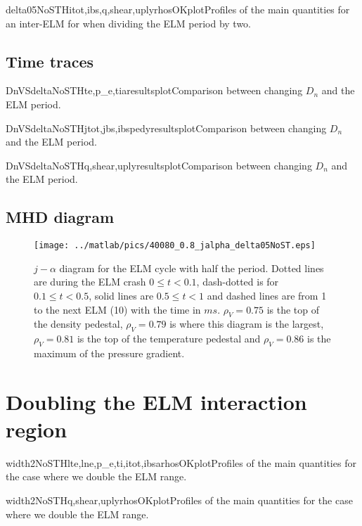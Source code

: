 \begin{AllFigs}{delta05NoST}{H}{}{itot,ibs,q,shear,upl}{y}{rhosOKplot}{Profiles of the main quantities for an inter-ELM for when dividing the ELM period by two.}
\end{AllFigs}
\subsection{Time traces}\label{sec:app:graphs:recovery:delta:traces}
\begin{AllFigs}{DnVSdeltaNoST}{H}{}{te,p_e,ti}{a}{resultsplot}{Comparison between changing $D_n$ and the ELM period.}
\end{AllFigs}

\begin{AllFigs}{DnVSdeltaNoST}{H}{}{jtot,jbs,ibsped}{y}{resultsplot}{Comparison between changing $D_n$ and the ELM period.}
\end{AllFigs}

\begin{AllFigs}{DnVSdeltaNoST}{H}{}{q,shear,upl}{y}{resultsplot}{Comparison between changing $D_n$ and the ELM period.}
\end{AllFigs}
\subsection{MHD diagram}\label{sec:app:graphs:recovery:delta:jalpha}
\begin{figure}[H]
\begin{center}
\texttt{[image: ../matlab/pics/40080\_0.8\_jalpha\_delta05NoST.eps]}
\vspace{-0.5cm}
\end{center}
\caption{\footnotesize $j - \alpha$ diagram for the ELM cycle with half the period. Dotted lines are during the ELM crash $0 \le t <0.1$, dash-dotted is for $0.1 \le t < 0.5$, solid lines are $0.5 \le t < 1$ and dashed lines are from 1 to the next ELM (10) with the time in $ms$. $\rho_V = 0.75$ is the top of the density pedestal, $\rho_V = 0.79$ is where this diagram is the largest, $\rho_V = 0.81$ is the top of the temperature pedestal and $\rho_V = 0.86$ is the maximum of the pressure gradient.\label{fig:results:ELM:delta05:jalpha}}
\vspace{-0.5cm}
\end{figure}
\section{Doubling the ELM interaction region}\label{sec:app:graphs:recovery:rhoELM}
\begin{AllFigs}{width2NoST}{H}{}{lte,lne,p_e,ti,itot,ibs}{a}{rhosOKplot}{Profiles of the main quantities for the case where we double the ELM range.}
\end{AllFigs}

\begin{AllFigs}{width2NoST}{H}{}{q,shear,upl}{y}{rhosOKplot}{Profiles of the main quantities for the case where we double the ELM range.}
\end{AllFigs}
